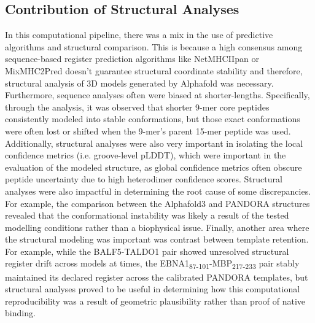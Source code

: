 \documentclass[11pt]{article}
\begin{document}
\subsection{Contribution of Structural Analyses}
In this computational pipeline, there was a mix in the use of predictive algorithms and structural comparison. This is because a high consensus among sequence-based register prediction algorithms like NetMHCIIpan or MixMHC2Pred doesn’t guarantee structural coordinate stability and therefore, structural analysis of 3D models generated by Alphafold was necessary. Furthermore, sequence analyses often were biased at shorter-lengths. Specifically, through the analysis, it was observed that shorter 9-mer core peptides consistently modeled into stable conformations, but those exact conformations were often lost or shifted when the 9-mer’s parent 15-mer peptide was used. Additionally, structural analyses were also very important in isolating the local confidence metrics (i.e. groove-level pLDDT), which were important in the evaluation of the modeled structure, as global confidence metrics often obscure peptide uncertainty due to high heterodimer confidence scores. Structural analyses were also impactful in determining the root cause of some discrepancies. For example, the comparison between the Alphafold3 and PANDORA structures revealed that the conformational instability was likely a result of the tested modelling conditions rather than a biophysical issue. Finally, another area where the structural modeling was important was contrast between template retention. For example, while the BALF5-TALDO1 pair showed unresolved structural register drift across models at times, the EBNA1\textsubscript{87-101}-MBP\textsubscript{217-233} pair stably maintained its declared register across the calibrated PANDORA templates, but structural analyses proved to be useful in determining how this computational reproducibility was a result of geometric plausibility rather than proof of native binding.
\end{document}
